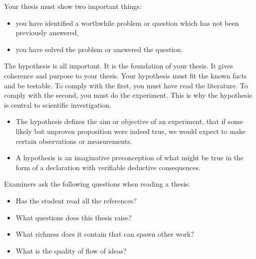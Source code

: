 Your thesis must show two important things:

\begin{itemize}
	\item you have identified a worthwhile problem or question which has not been previously 
	answered,
	\item you have solved the problem or answered the question.
\end{itemize}

The hypothesis is all important. It is the foundation of your thesis. It gives coherence
and purpose to your thesis. Your hypothesis must fit the known facts and be testable.
To comply with the first, you must have read the literature. To comply with the second, you must do
the experiment. This is why the hypothesis is central to scientific investigation.

\begin{itemize}
	\item The hypothesis defines the aim or objective of an experiment, that if some likely but
unproven proposition were indeed true, we would expect to make certain observations or measurements.
	\item A hypothesis is an imaginative preconception of what might be true in the form of
a declaration with verifiable deductive consequences.
\end{itemize}

Examiners ask the following questions when reading a thesis:

\begin{itemize}
  \item Has the student read all the references?
  \item What questions does this thesis raise?
  \item What richness does it contain that can spawn other work?
  \item What is the quality of flow of ideas?
\end{itemize}